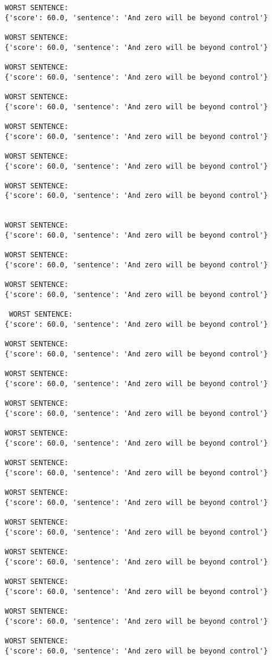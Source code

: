 \documentclass[12pt,a4paper,oneside]{book}
\begin{document}
\begin{verbatim}
WORST SENTENCE:
{'score': 60.0, 'sentence': 'And zero will be beyond control'}

WORST SENTENCE:
{'score': 60.0, 'sentence': 'And zero will be beyond control'}

WORST SENTENCE:
{'score': 60.0, 'sentence': 'And zero will be beyond control'}

WORST SENTENCE:
{'score': 60.0, 'sentence': 'And zero will be beyond control'}

WORST SENTENCE:
{'score': 60.0, 'sentence': 'And zero will be beyond control'}

WORST SENTENCE:
{'score': 60.0, 'sentence': 'And zero will be beyond control'}

WORST SENTENCE:
{'score': 60.0, 'sentence': 'And zero will be beyond control'}
 
 
WORST SENTENCE:
{'score': 60.0, 'sentence': 'And zero will be beyond control'}

WORST SENTENCE:
{'score': 60.0, 'sentence': 'And zero will be beyond control'}

WORST SENTENCE:
{'score': 60.0, 'sentence': 'And zero will be beyond control'}

 WORST SENTENCE:
{'score': 60.0, 'sentence': 'And zero will be beyond control'}

WORST SENTENCE:
{'score': 60.0, 'sentence': 'And zero will be beyond control'}

WORST SENTENCE:
{'score': 60.0, 'sentence': 'And zero will be beyond control'}

WORST SENTENCE:
{'score': 60.0, 'sentence': 'And zero will be beyond control'}

WORST SENTENCE:
{'score': 60.0, 'sentence': 'And zero will be beyond control'}

WORST SENTENCE:
{'score': 60.0, 'sentence': 'And zero will be beyond control'}

WORST SENTENCE:
{'score': 60.0, 'sentence': 'And zero will be beyond control'}

WORST SENTENCE:
{'score': 60.0, 'sentence': 'And zero will be beyond control'}

WORST SENTENCE:
{'score': 60.0, 'sentence': 'And zero will be beyond control'}

WORST SENTENCE:
{'score': 60.0, 'sentence': 'And zero will be beyond control'}

WORST SENTENCE:
{'score': 60.0, 'sentence': 'And zero will be beyond control'}

WORST SENTENCE:
{'score': 60.0, 'sentence': 'And zero will be beyond control'}


\end{verbatim}
\end{document}
